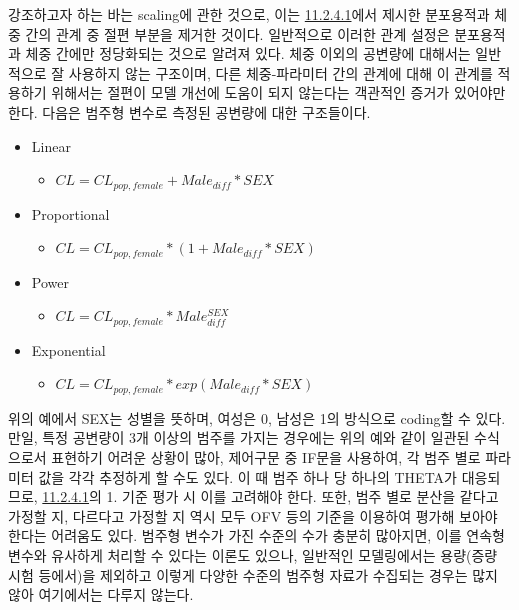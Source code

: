 \documentclass[
  10pt,
  krantz2,
  a4paper]{krantz}
\providecommand{\tightlist}{%
  \setlength{\itemsep}{0pt}\setlength{\parskip}{0pt}}
\theoremstyle{definition}
\theoremstyle{definition}
\theoremstyle{definition}
\theoremstyle{remark}
\begin{document}
강조하고자 하는 바는 scaling에 관한 것으로, 이는 \protect\hyperlink{forward-sel-def}{11.2.4.1}에서 제시한 분포용적과 체중 간의 관계 중 절편 부분을 제거한 것이다. 일반적으로 이러한 관계 설정은 분포용적과 체중 간에만 정당화되는 것으로 알려져 있다. 체중 이외의 공변량에 대해서는 일반적으로 잘 사용하지 않는 구조이며, 다른 체중-파라미터 간의 관계에 대해 이 관계를 적용하기 위해서는 절편이 모델 개선에 도움이 되지 않는다는 객관적인 증거가 있어야만 한다. 다음은 범주형 변수로 측정된 공변량에 대한 구조들이다.

\begin{itemize}
\tightlist
\item
  Linear

  \begin{itemize}
  \tightlist
  \item
    \(CL = CL_{pop,female} + Male_{diff}*SEX\)
  \end{itemize}
\item
  Proportional

  \begin{itemize}
  \tightlist
  \item
    \(CL = CL_{pop,female} * (1 + Male_{diff}*SEX)\)
  \end{itemize}
\item
  Power

  \begin{itemize}
  \tightlist
  \item
    \(CL = CL_{pop,female} * Male_{diff}^{SEX}\)
  \end{itemize}
\item
  Exponential

  \begin{itemize}
  \tightlist
  \item
    \(CL = CL_{pop,female} * exp(Male_{diff}*SEX)\)
  \end{itemize}
\end{itemize}

위의 예에서 SEX는 성별을 뜻하며, 여성은 0, 남성은 1의 방식으로 coding할 수 있다. 만일, 특정 공변량이 3개 이상의 범주를 가지는 경우에는 위의 예와 같이 일관된 수식으로서 표현하기 어려운 상황이 많아, 제어구문 중 IF문을 사용하여, 각 범주 별로 파라미터 값을 각각 추정하게 할 수도 있다. 이 때 범주 하나 당 하나의 THETA가 대응되므로, \protect\hyperlink{forward-sel-def}{11.2.4.1}의 1. 기준 평가 시 이를 고려해야 한다. 또한, 범주 별로 분산을 같다고 가정할 지, 다르다고 가정할 지 역시 모두 OFV 등의 기준을 이용하여 평가해 보아야 한다는 어려움도 있다. 범주형 변수가 가진 수준의 수가 충분히 많아지면, 이를 연속형 변수와 유사하게 처리할 수 있다는 이론도 있으나, 일반적인 모델링에서는 용량(증량 시험 등에서)을 제외하고 이렇게 다양한 수준의 범주형 자료가 수집되는 경우는 많지 않아 여기에서는 다루지 않는다.
\end{document}
